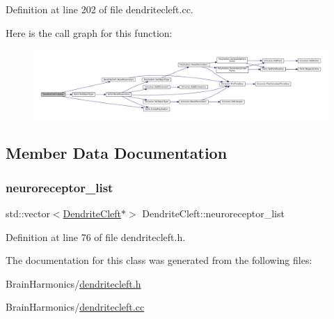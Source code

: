 Definition at line 202 of file dendritecleft.\+cc.

Here is the call graph for this function\+:\nopagebreak
\begin{figure}[H]
\begin{center}
\leavevmode
\includegraphics[width=350pt]{class_dendrite_cleft_a3a75af4d6fd97c9635134509f170a04e_cgraph}
\end{center}
\end{figure}


\subsection{Member Data Documentation}
\mbox{\label{class_dendrite_cleft_a42de9c556ce58c9f511031361755a0c3}} 
\subsubsection{\texorpdfstring{neuroreceptor\+\_\+list}{neuroreceptor\_list}}
{\footnotesize\ttfamily std\+::vector$<$\mbox{\hyperlink{class_dendrite_cleft}{Dendrite\+Cleft}}$\ast$$>$ Dendrite\+Cleft\+::neuroreceptor\+\_\+list\hspace{0.3cm}{\ttfamily [protected]}}



Definition at line 76 of file dendritecleft.\+h.



The documentation for this class was generated from the following files\+:\begin{DoxyCompactItemize}
\item 
Brain\+Harmonics/\mbox{\hyperlink{dendritecleft_8h}{dendritecleft.\+h}}\item 
Brain\+Harmonics/\mbox{\hyperlink{dendritecleft_8cc}{dendritecleft.\+cc}}\end{DoxyCompactItemize}
